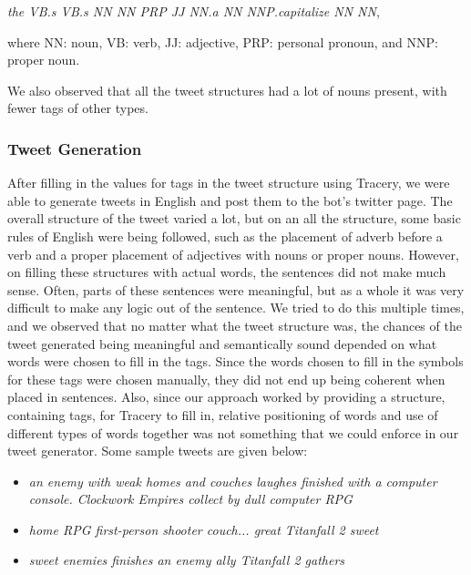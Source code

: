     \textit{the VB.s VB.s NN NN PRP JJ NN.a NN NNP.capitalize NN NN},
    
where NN: noun, VB: verb, JJ: adjective, PRP: personal pronoun, and NNP: proper noun.

We also observed that all the tweet structures had a lot of nouns present, with fewer tags of other types.

\subsubsection{Tweet Generation}
After filling in the values for tags in the tweet structure using Tracery, we were able to generate tweets in English and post them to the bot's twitter page. The overall structure of the tweet varied a lot, but on an all the structure, some basic rules of English were being followed, such as the placement of adverb before a verb and a proper placement of adjectives with nouns or proper nouns. However, on filling these structures with actual words, the sentences did not make much sense. Often, parts of these sentences were meaningful, but as a whole it was very difficult to make any logic out of the sentence. We tried to do this multiple times, and we observed that no matter what the tweet structure was, the chances of the tweet generated being meaningful and semantically sound depended on what words were chosen to fill in the tags. Since the words chosen to fill in the symbols for these tags were chosen manually, they did not end up being coherent when placed in sentences. Also, since our approach worked by providing a structure, containing tags, for Tracery to fill in, relative positioning of words and use of different types of words together was not something that we could enforce in our tweet generator.
Some sample tweets are given below:
\begin{itemize}
    \item{\textit{an enemy with weak homes and couches laughes finished with  a computer console. Clockwork Empires collect by dull computer RPG}}
    \item{\textit{home RPG first-person shooter couch... great Titanfall 2 sweet}}
    \item{\textit{sweet enemies finishes  an enemy ally Titanfall 2 gathers}}
\end{itemize}